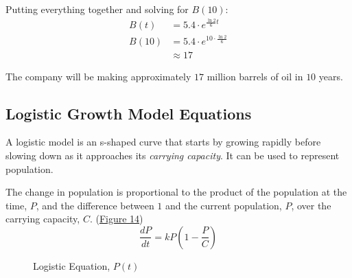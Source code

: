 \documentclass[12pt]{article}
\begin{document}
\begin{enumerate}
          Putting everything together and solving for $B(10)$:
          \begin{align*}
              B(t)  & = 5.4 \cdot e^{\frac{\ln 2}{6} t}        \\
              B(10) & = 5.4 \cdot e^{10 \cdot \frac{\ln 2}{6}} \\
                    & \approx 17
          \end{align*}

          The company will be making approximately $17$ million barrels of oil in $10$ years.
\end{enumerate}

\subsection{Logistic Growth Model Equations}
A logistic model is an s-shaped curve that starts by growing rapidly before slowing down as it approaches its \textit{carrying capacity}. It can be used to represent population.

The change in population is proportional to the product of the population at the time, $P$, and the difference between $1$ and the current population, $P$, over the carrying capacity, $C$. (\hyperref[fig:logisticeq]{Figure 14})
\[ \frac{dP}{dt} = kP \left( 1 - \frac{P}{C} \right) \]

\begin{figure}[H]
    \begin{center}
        \caption{Logistic Equation, $P(t)$}
        \label{fig:logisticeq}
    \end{center}
\end{figure}
\end{document}
